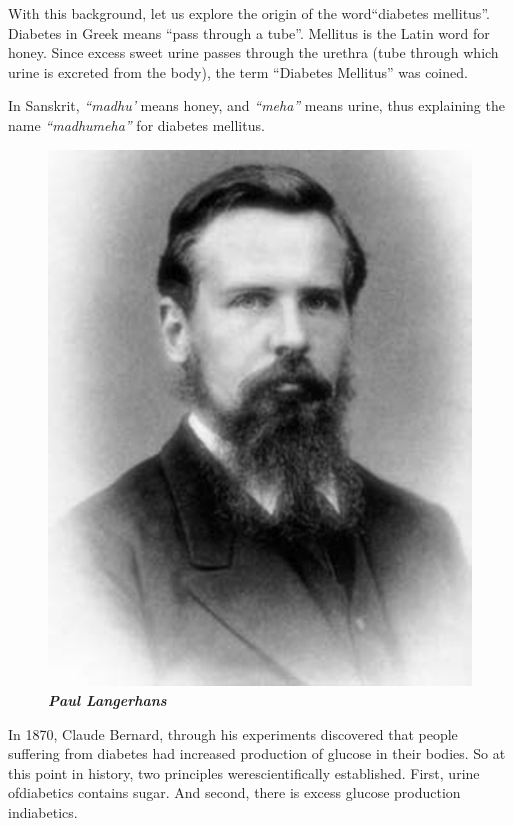 With this background, let us explore the origin of the word\break “diabetes mellitus”. Diabetes in Greek means “pass through a tube”. Mellitus is the Latin word for honey. Since excess sweet urine passes through the urethra (tube through which urine is excreted from the body), the term “Diabetes Mellitus” was coined.

In Sanskrit, \textit{“madhu’} means honey, and \textit{“meha”} means urine, thus explaining the name \textit{“madhumeha”} for diabetes mellitus.

\begin{figure}
\centering
\includegraphics[scale=.9]{images/008.jpg}\\
\textbf{\textit{Paul Langerhans}}
\end{figure}

In 1870, Claude Bernard, through his experiments discovered that people suffe\-ring from diabetes had increased produ\-ction of glucose in their bodies. So at this point in history, two principles were\break scientifically established. First, urine of\break diabetics contains sugar. And second, there is excess glucose production in\break diabetics.

